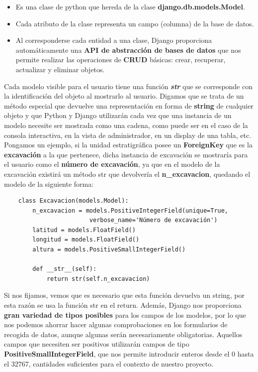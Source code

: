         \begin{itemize}
            \item Es una clase de python que hereda de la clase \textbf{django.db.models.Model}.
            \item Cada atributo de la clase representa un campo (columna) de la base de datos.
            \item Al corresponderse cada entidad a una clase, Django proporciona automáticamente
            una \textbf{API de abstracción de bases de datos} que nos permite realizar las
            operaciones de \textbf{CRUD} básicas: crear, recuperar, actualizar y eliminar
            objetos.
        \end{itemize}

    Cada modelo visible para el usuario tiene una función \textbf{\textit{str}} que se
    corresponde con la identificación del objeto al mostrarlo al usuario. Digamos que se
    trata de un método especial que devuelve una representación en forma de \textbf{string} de
    cualquier objeto y que Python y Django utilizarán cada vez que una instancia de un 
    modelo necesite ser mostrada como una cadena, como puede ser en el caso de la consola
    interactiva, en la vista de administrador, en un display de una tabla, etc.\\

    Pongamos un ejemplo, si la unidad estratigráfica posee un \textbf{ForeignKey} que es
    la \textbf{excavación} a la que pertenece, dicha instancia de excavación se mostraría
    para el usuario como el \textbf{número de excavación}, ya que en el modelo de la
    excavación existirá un método str que devolvería el \textbf{n\_excavacion},
    quedando el modelo de la siguiente forma:

    \begin{verbatim}
    class Excavacion(models.Model):
        n_excavacion = models.PositiveIntegerField(unique=True, 
                        verbose_name='Número de excavación')
        latitud = models.FloatField()
        longitud = models.FloatField()
        altura = models.PositiveSmallIntegerField()

        def __str__(self):
            return str(self.n_excavacion)
    \end{verbatim}

    Si nos fijamos, vemos que es necesario que esta función devuelva un string, por esta
    razón se usa la función str en el return. Además, Django nos proporciona \textbf{gran
    variedad de tipos posibles} para los campos de los modelos, por lo que nos podemos
    ahorrar hacer algunas comprobaciones en los formularios de recogida de datos, aunque
    algunas serán necesariamente obligatorias. Aquellos campos que necesiten ser positivos
    utilizarán campos de tipo \textbf{PositiveSmallIntegerField}, que nos permite introducir
    enteros desde el 0 hasta el 32767, cantidades suficientes para el contexto de nuestro
    proyecto.\\

